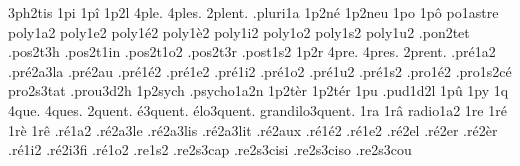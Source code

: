 {                    3ph2tis
1pi
1pî
1p2l
4ple.
4ples.
2plent. %
                    .pluri1a
                    1p2né
                    1p2neu
1po
1pô
                    po1astre
                    poly1a2
                    poly1e2
                    poly1é2
                    poly1è2
                    poly1i2
                    poly1o2
                    poly1s2
                    poly1u2
                    .pon2tet %
                    .pos2t3h
                    .pos2t1in
                    .pos2t1o2
                    .pos2t3r
                    .post1s2
1p2r
4pre.
4pres.
2prent. %
                    .pré1a2
                    .pré2a3la %
                    .pré2au
                    .pré1é2
                    .pré1e2
                    .pré1i2
                    .pré1o2
                    .pré1u2
                    .pré1s2
                    .pro1é2
                    .pro1s2cé
                    pro2s3tat
                    .prou3d2h
                    1p2sych
                    .psycho1a2n
                    1p2tèr
                    1p2tér
1pu
                    .pud1d2l
1pû
1py
1q
4que.
4ques.
        2quent.
     é3quent.
   élo3quent.
grandilo3quent.
1ra
1râ
                    radio1a2 %
1re
1ré
1rè
1rê
                    .ré1a2
                    .ré2a3le
                    .ré2a3lis
                    .ré2a3lit
                    .ré2aux
                    .ré1é2
                    .ré1e2
                    .ré2el
                    .ré2er
                    .ré2èr
                    .ré1i2
                    .ré2i3fi
                    .ré1o2
                    .re1s2
                    .re2s3cap
                    .re2s3cisi %
                    .re2s3ciso %
                    .re2s3cou
}
